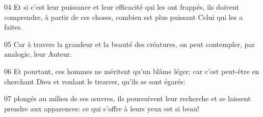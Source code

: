 
04 Et si c’est leur puissance et leur efficacité qui les ont frappés, ils doivent comprendre, à partir de ces choses, combien est plus puissant Celui qui les a faites.

05 Car à travers la grandeur et la beauté des créatures, on peut contempler, par analogie, leur Auteur.

06 Et pourtant, ces hommes ne méritent qu’un blâme léger; car c’est peut-être en cherchant Dieu et voulant le trouver, qu’ils se sont égarés:

07 plongés au milieu de ses œuvres, ils poursuivent leur recherche et se laissent prendre aux apparences: ce qui s’offre à leurs yeux est si beau!

